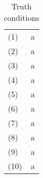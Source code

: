 \begin{center}
    \begin{table}[h!]
\label{table:sentences}
    \caption{Truth conditions}

    \begin{tabular}{ll}
        \vspace{2mm}
        (1) & a \\
        \vspace{2mm}
        (2)  & a \\
        \vspace{2mm}
        (3)  & a \\
        \vspace{2mm}
        (4)  &a \\
        \vspace{2mm}
        (5)  & a \\
        \vspace{2mm}
        (6)  &a \\
        \vspace{2mm}
        (7)  &a \\
        \vspace{2mm}
        (8)  &a \\
        \vspace{2mm}
        (9)  &a \\
        \vspace{2mm}
        (10) &a
    \end{tabular}
\end{table}
\end{center}

















